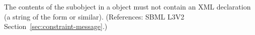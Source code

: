 The contents of the \Message subobject in a \Constraint object must not
contain an XML declaration (\ie a string of the form  or similar).  (References: SBML L3V2
Section~\ref{sec:constraint-message}.)
